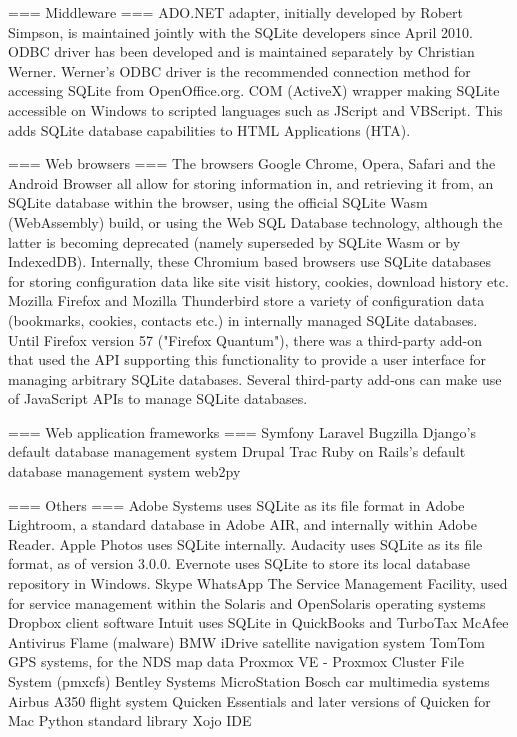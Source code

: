 === Middleware ===
ADO.NET adapter, initially developed by Robert Simpson, is maintained jointly with the SQLite developers since April 2010.
ODBC driver has been developed and is maintained separately by Christian Werner. Werner's ODBC driver is the recommended connection method for accessing SQLite from OpenOffice.org.
COM (ActiveX) wrapper making SQLite accessible on Windows to scripted languages such as JScript and VBScript. This adds SQLite database capabilities to HTML Applications (HTA).


=== Web browsers ===
The browsers Google Chrome, Opera, Safari and the Android Browser all allow for storing information in, and retrieving it from, an SQLite database within the browser, using the official SQLite Wasm (WebAssembly) build, or using the Web SQL Database technology, although the latter is becoming deprecated (namely superseded by SQLite Wasm or by IndexedDB). Internally, these Chromium based browsers use SQLite databases for storing configuration data like site visit history, cookies, download history etc.
Mozilla Firefox and Mozilla Thunderbird store a variety of configuration data (bookmarks, cookies, contacts etc.) in internally managed SQLite databases. Until Firefox version 57 ("Firefox Quantum"), there was a third-party add-on that used the API supporting this functionality to provide a user interface for managing arbitrary SQLite databases.
Several third-party add-ons can make use of JavaScript APIs to manage SQLite databases.


=== Web application frameworks ===
Symfony
Laravel
Bugzilla
Django's default database management system
Drupal
Trac
Ruby on Rails's default database management system
web2py


=== Others ===
Adobe Systems uses SQLite as its file format in Adobe Lightroom, a standard database in Adobe AIR, and internally within Adobe Reader.
Apple Photos uses SQLite internally.
Audacity uses SQLite as its file format, as of version 3.0.0.
Evernote uses SQLite to store its local database repository in Windows.
Skype
WhatsApp
The Service Management Facility, used for service management within the Solaris and OpenSolaris operating systems
Dropbox client software
Intuit uses SQLite in QuickBooks and TurboTax
McAfee Antivirus
Flame (malware)
BMW iDrive satellite navigation system
TomTom GPS systems, for the NDS map data
Proxmox VE - Proxmox Cluster File System (pmxcfs)
Bentley Systems MicroStation
Bosch car multimedia systems
Airbus A350 flight system
Quicken Essentials and later versions of Quicken for Mac
Python standard library
Xojo IDE


